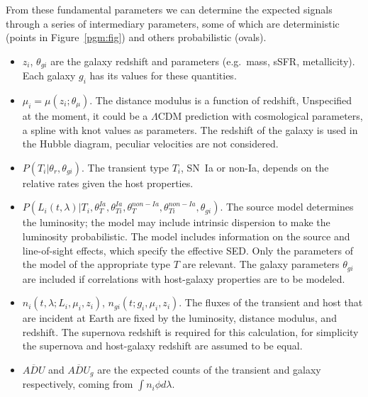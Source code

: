 \documentclass[preprint]{aastex}
\begin{document}
From these fundamental parameters we can determine the expected
signals
through a series of intermediary parameters,
some of which are deterministic (points in Figure~\ref{pgm:fig}) and others
probabilistic (ovals).
\begin{itemize}
\item $z_i$, $\theta_{gi}$ are the galaxy redshift and parameters (e.g.\ mass, sSFR, metallicity).
Each galaxy $g_i$ has its values for these quantities.
\item $\mu_i=\mu(z_i; \theta_\mu)$.  The distance modulus is a function of redshift,
Unspecified at the moment,  it could
be a $\Lambda$CDM prediction with cosmological parameters, a spline with knot values
as parameters.
The redshift of the galaxy is used in the Hubble diagram, peculiar velocities are not considered.
\item $P(T_i | \theta_r, \theta_{gi})$.  The transient type $T_i$, SN~Ia or non-Ia, depends
on the relative rates given the host properties.
\item $P(L_i(t,\lambda)| T_i, \theta_T^{Ia}, \theta_{Ti}^{Ia}, \theta_T^{\mathit{non-Ia}}, \theta_{Ti}^{\mathit{non-Ia}},
\theta_{gi})$.  The source model determines
the luminosity; the model may include intrinsic dispersion to make the luminosity
probabilistic. The  model includes  information on the
source and line-of-sight effects, which specify the effective SED.   Only the
parameters of the model of the appropriate type $T$ are relevant.  The galaxy parameters
$\theta_{gi}$ are included if correlations with host-galaxy properties are to be modeled.
\item $n_i(t,\lambda; L_i, \mu_i, z_i)$, $n_{gi}(t; g_i, \mu_i, z_i)$.  The  fluxes of
the transient and host that are incident at Earth
are fixed by the luminosity, distance modulus, and redshift.
The supernova redshift is required for this calculation,
for simplicity the supernova and host-galaxy redshift are assumed to be equal.
\item $\overline{\mathit{ADU}}$ and
$\overline{\mathit{ADU}}_g$ are the expected counts of the transient and galaxy respectively,
coming from $\int n_i \phi d\lambda$.  
\end{itemize}
\end{document}
